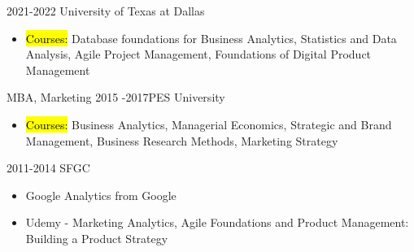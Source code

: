 
{2021-2022 }{University of Texas at Dallas}
 
\begin{itemize}
\item \textcolor{accent}{\hl{Courses:}} 
Database foundations for Business Analytics, Statistics and Data Analysis, Agile Project Management, Foundations of Digital Product Management
\end{itemize}

\cvevent{} {MBA, Marketing}
{2015 -2017}{PES University}
\begin{itemize}
\item \textcolor{accent}{\hl{Courses:}} 
Business Analytics, Managerial Economics, Strategic and Brand Management, Business Research Methods, Marketing Strategy
\end{itemize}

{2011-2014 }{SFGC}












\divider
{}



{}

\begin{itemize}
\item Google Analytics from Google
\item Udemy - Marketing Analytics, Agile Foundations and
Product Management: Building a Product Strategy
\end{itemize}











